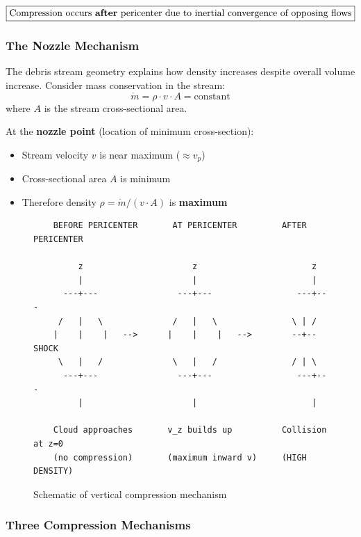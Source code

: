 \documentclass[twocolumn,amsmath,amssymb,prd,superscriptaddress,nofootinbib]{revtex4-2}
\begin{document}
\begin{equation}
    \boxed{\text{Compression occurs \textbf{after} pericenter due to inertial convergence of opposing flows}}
\end{equation}

\subsubsection{The Nozzle Mechanism}

The debris stream geometry explains how density increases despite overall volume increase. Consider mass conservation in the stream:
\begin{equation}
    \dot{m} = \rho \cdot v \cdot A = \text{constant}
    \label{eq:mass_conservation_stream}
\end{equation}
where $A$ is the stream cross-sectional area.

At the \textbf{nozzle point} (location of minimum cross-section):
\begin{itemize}
    \item Stream velocity $v$ is near maximum ($\approx v_p$)
    \item Cross-sectional area $A$ is minimum
    \item Therefore density $\rho = \dot{m}/(v \cdot A)$ is \textbf{maximum}
\end{itemize}

\begin{figure}[h]
\centering
\begin{verbatim}
    BEFORE PERICENTER       AT PERICENTER         AFTER PERICENTER

         z                      z                       z
         |                      |                       |
      ---+---                ---+---                 ---+---
     /   |   \              /   |   \               \ | /
    |    |    |   -->      |    |    |   -->        --+--  SHOCK
     \   |   /              \   |   /               / | \
      ---+---                ---+---                 ---+---
         |                      |                       |

    Cloud approaches       v_z builds up          Collision at z=0
    (no compression)       (maximum inward v)     (HIGH DENSITY)
\end{verbatim}
\caption{Schematic of vertical compression mechanism}
\label{fig:compression_schematic}
\end{figure}

\subsubsection{Three Compression Mechanisms}
\end{document}
